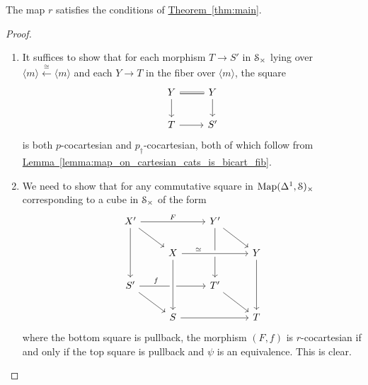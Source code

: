 \documentclass[main.tex]{subfiles}
\begin{document}
\begin{lemma}
  The map $r$ satisfies the conditions of \hyperref[thm:main]{Theorem~\ref*{thm:main}}.
\end{lemma}
\begin{proof}
  \leavevmode
  \begin{enumerate}
    \item It suffices to show that for each morphism $T \to S'$ in $\S_{\times}$ lying over $\langle m \rangle \overset{\cong}{\leftarrow} \langle m \rangle$ and each $Y \to T$ in the fiber over $\langle m \rangle$, the square
      \begin{equation*}
        \begin{tikzcd}
          Y
          \arrow[r, equals]
          \arrow[d]
          & Y
          \arrow[d]
          \\
          T
          \arrow[r]
          & S'
        \end{tikzcd}
      \end{equation*}
      is both $p$-cocartesian and $p_{\dagger}$-cocartesian, both of which follow from \hyperref[lemma:map_on_cartesian_cats_is_bicart_fib]{Lemma~\ref*{lemma:map_on_cartesian_cats_is_bicart_fib}}.

    \item We need to show that for any commutative square in $\Map(\Delta^{1}, \S)_{\times}$ corresponding to a cube in $\S_{\times}$ of the form
      \begin{equation*}
        \begin{tikzcd}
          X'
          \arrow[rr, "F"]
          \arrow[dd]
          \arrow[dr]
          && Y'
          \arrow[dd]
          \arrow[dr]
          \\
          & X
          \arrow[rr, crossing over, near start, "\simeq"]
          && Y
          \arrow[dd]
          \\
          S'
          \arrow[dr]
          \arrow[rr, near start, "f"]
          && T'
          \arrow[dr]
          \\
          & S
          \arrow[from=uu, crossing over]
          \arrow[rr]
          && T
        \end{tikzcd}
      \end{equation*}
      where the bottom square is pullback, the morphism $(F, f)$ is $r$-cocartesian if and only if the top square is pullback and $\psi$ is an equivalence. This is clear.
  \end{enumerate}
\end{proof}
\end{document}
